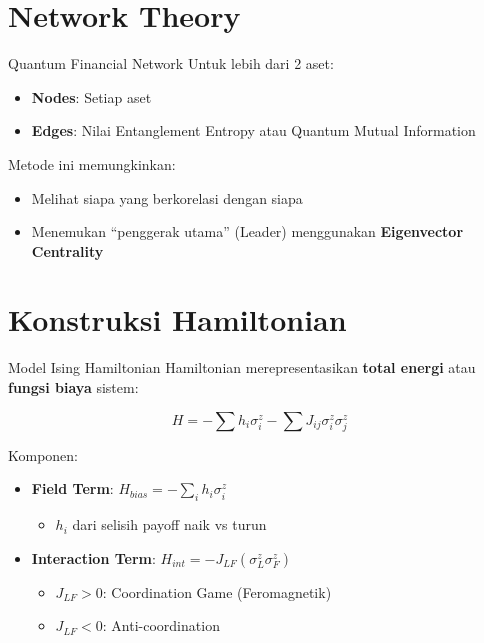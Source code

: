 \documentclass[aspectratio=169]{beamer}
\begin{document}
\section{Network Theory}

\begin{frame}{Quantum Financial Network}
    Untuk lebih dari 2 aset:
    
    \begin{itemize}
        \item \textbf{Nodes}: Setiap aset
        \item \textbf{Edges}: Nilai Entanglement Entropy atau Quantum Mutual Information
    \end{itemize}
    
    \vspace{0.5cm}
    
    Metode ini memungkinkan:
    \begin{itemize}
        \item Melihat siapa yang berkorelasi dengan siapa
        \item Menemukan ``penggerak utama'' (Leader) menggunakan \textbf{Eigenvector Centrality}
    \end{itemize}
\end{frame}

\section{Konstruksi Hamiltonian}

\begin{frame}{Model Ising Hamiltonian}
    Hamiltonian merepresentasikan \textbf{total energi} atau \textbf{fungsi biaya} sistem:
    
    \begin{equation}
        H = -\sum h_i \sigma_i^z - \sum J_{ij} \sigma_i^z \sigma_j^z
    \end{equation}
    
    \vspace{0.3cm}
    
    Komponen:
    \begin{itemize}
        \item \textbf{Field Term}: $H_{bias} = -\sum_{i} h_i \sigma_i^z$
            \begin{itemize}
                \item $h_i$ dari selisih payoff naik vs turun
            \end{itemize}
        \item \textbf{Interaction Term}: $H_{int} = -J_{LF} (\sigma_L^z \sigma_F^z)$
            \begin{itemize}
                \item $J_{LF} > 0$: Coordination Game (Feromagnetik)
                \item $J_{LF} < 0$: Anti-coordination
            \end{itemize}
    \end{itemize}
\end{frame}
\end{document}
